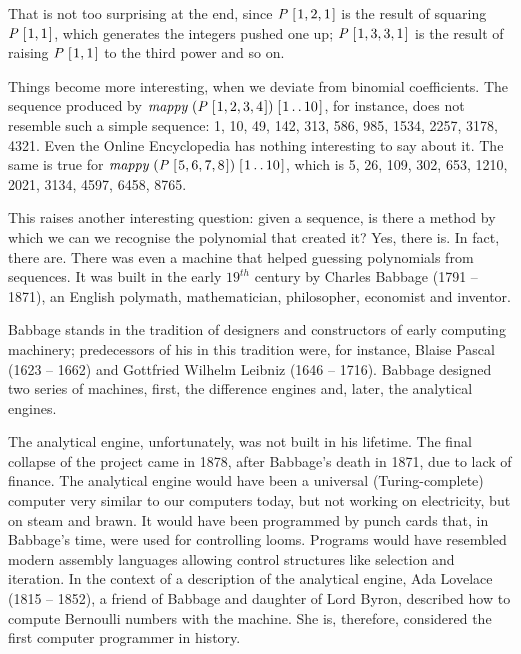 \documentclass[tikz]{scrreprt}
\newcommand{\Conid}[1]{\mathit{#1}}
\newcommand{\Varid}[1]{\mathit{#1}}
\begin{document}
That is not too surprising at the end, since
\ensuremath{\Conid{P}\;[\mskip1.5mu \mathrm{1},\mathrm{2},\mathrm{1}\mskip1.5mu]} is the result of squaring \ensuremath{\Conid{P}\;[\mskip1.5mu \mathrm{1},\mathrm{1}\mskip1.5mu]}, 
which generates the integers pushed one up;
\ensuremath{\Conid{P}\;[\mskip1.5mu \mathrm{1},\mathrm{3},\mathrm{3},\mathrm{1}\mskip1.5mu]} is the result of raising \ensuremath{\Conid{P}\;[\mskip1.5mu \mathrm{1},\mathrm{1}\mskip1.5mu]} to the third power
and so on.

Things become more interesting, when we deviate
from binomial coefficients. The sequence
produced by \ensuremath{\Varid{mappy}\;(\Conid{P}\;[\mskip1.5mu \mathrm{1},\mathrm{2},\mathrm{3},\mathrm{4}\mskip1.5mu])\;[\mskip1.5mu \mathrm{1}\mathinner{\ldotp\ldotp}\mathrm{10}\mskip1.5mu]}, for instance,
does not resemble such a simple sequence:
1, 10, 49, 142, 313, 586, 985, 1534, 2257, 3178, 4321.
Even the Online Encyclopedia has nothing interesting
to say about it.
The same is true for \ensuremath{\Varid{mappy}\;(\Conid{P}\;[\mskip1.5mu \mathrm{5},\mathrm{6},\mathrm{7},\mathrm{8}\mskip1.5mu])\;[\mskip1.5mu \mathrm{1}\mathinner{\ldotp\ldotp}\mathrm{10}\mskip1.5mu]},
which is 5, 26, 109, 302, 653, 1210, 2021, 3134, 4597, 6458, 8765.

This raises another interesting question:
given a sequence, is there a method by which 
we can we recognise the polynomial that created it?
Yes, there is. In fact, there are.
There was even a machine that helped guessing
polynomials from sequences. It was built in the early
$19^{th}$ century by Charles Babbage (1791 -- 1871),
an English polymath, mathematician, philosopher,
economist and inventor.

Babbage stands in the tradition of designers and constructors
of early computing machinery; predecessors of his
in this tradition were, for instance, 
Blaise Pascal (1623 -- 1662) and
Gottfried Wilhelm Leibniz (1646 -- 1716).
Babbage designed two series of machines,
first, the difference engines and, later, 
the analytical engines.

The analytical engine, unfortunately, was not built in his lifetime.
The final collapse of the project came 
in 1878, after Babbage's death in 1871, 
due to lack of finance. 
The analytical engine would have been 
a universal (Turing-complete) computer
very similar to our computers today,
but not working on electricity, but on steam and brawn.
It would have been programmed by punch cards that,
in Babbage's time, were used for controlling looms.
Programs would have resembled modern assembly languages
allowing control structures like selection and iteration.
In the context of a description of the analytical engine,
Ada Lovelace (1815 -- 1852), 
a friend of Babbage and daughter of Lord Byron,
described how to compute Bernoulli numbers with the machine.
She is, therefore, considered the first computer programmer
in history.
\end{document}
